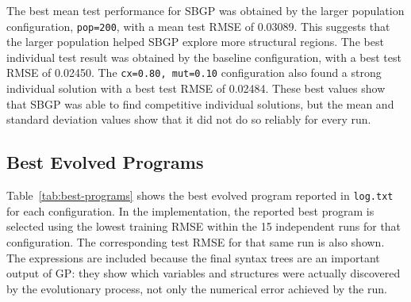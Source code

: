 \documentclass{article}
\begin{document}
\begin{table}[h]
\centering
{}
\caption{SBGP RMSE results across 15 runs per configuration. Baseline = (pop=100, cx=0.70, mut=0.15, hoist=0.02, depth=2-6).}
\label{tab:sbgp-results}
\end{table}

The best mean test performance for SBGP was obtained by the larger population configuration, \texttt{pop=200}, with a mean test RMSE of 0.03089. This suggests that the larger population helped SBGP explore more structural regions. The best individual test result was obtained by the baseline configuration, with a best test RMSE of 0.02450. The \texttt{cx=0.80, mut=0.10} configuration also found a strong individual solution with a best test RMSE of 0.02484. These best values show that SBGP was able to find competitive individual solutions, but the mean and standard deviation values show that it did not do so reliably for every run.

\subsection{Best Evolved Programs}

Table~\ref{tab:best-programs} shows the best evolved program reported in \texttt{log.txt} for each configuration. In the implementation, the reported best program is selected using the lowest training RMSE within the 15 independent runs for that configuration. The corresponding test RMSE for that same run is also shown. The expressions are included because the final syntax trees are an important output of GP: they show which variables and structures were actually discovered by the evolutionary process, not only the numerical error achieved by the run.
\end{document}
